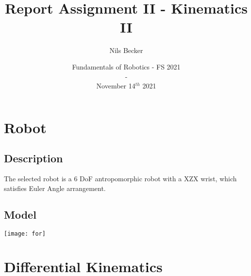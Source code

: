 \documentclass{article}
\title{Report Assignment II -  Kinematics II}
\date{Fundamentals of Robotics - FS 2021\\-\\November 14$^{th}$ 2021}
\author{Nils Becker}
\begin{document}
\maketitle
\newpage
\section{Robot}
\subsection{Description}
The selected robot is a 6 DoF antropomorphic robot with a XZX wrist, which satisfies Euler Angle arrangement.
\subsection{Model}
\texttt{[image: for]}
\newpage
\section{Differential Kinematics}
\end{document}
